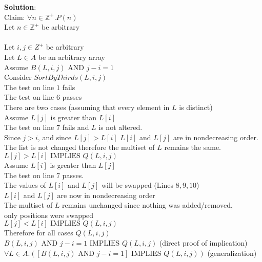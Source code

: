 \documentclass[11pt]{article}
\def\ints {{\mathbb Z}}
\newcommand{\Implies}{\mbox{ IMPLIES }}
\newcommand{\And}{\mbox{ AND }}
\begin{document}
\begin{enumerate}
\begin{solution}
{\bf Solution}:\\
Claim: $\forall n\in \ints^+.P(n)$\\
\null\quad Let $n\in \ints^+$ be arbitrary\\
\null{}\\
\null\qquad Let $i, j\in Z^+$ be arbitrary\\
\null\qquad\quad Let $L\in A$ be an arbitrary array\\
\null\qquad\qquad Assume $B(L, i, j) \And  j - i= 1$\\
\null\qquad\qquad Consider $SortByThirds(L, i, j)$\\
\null\qquad\qquad The test on line $1$ fails\\
\null\qquad\qquad The test on line $6$ passes\\
\null\qquad\qquad There are two cases (assuming that every element in $L$ is distinct)\\
\null\qquad\qquad\quad Assume $L[j]$ is greater than $L[i]$\\
\null\qquad\qquad\quad The test on line $7$ fails and $L$ is not altered.\\
\null\qquad\qquad\quad Since $j>i$, and since $L[j]>L[i]$ $L[i]$ and $L[j]$ are in nondecreasing order.\\
\null\qquad\qquad\quad The list is not changed therefore the multiset of $L$ remains the same.\\
\null\qquad\qquad $L[j]>L[i]\Implies Q(L, i, j)$\\
\null\qquad\qquad\quad Assume $L[i]$ is greater than $L[j]$\\
\null\qquad\qquad\quad The test on line $7$ passes.\\
\null\qquad\qquad\quad The values of $L[i]$ and $L[j]$ will be swapped (Lines $8,9,10$)\\
\null\qquad\qquad\quad $L[i]$ and $L[j]$ are now in nondecreasing order\\
\null\qquad\qquad\quad The multiset of $L$ remains unchanged since nothing was added/removed, \\
\null\qquad\qquad\quad only positions were swapped\\
\null\qquad\qquad $L[j] < L[i]\Implies Q(L, i, j)$\\
\null\qquad\qquad Therefore for all cases $Q(L, i, j)$\\
\null\qquad\quad $B(L, i, j) \And  j - i= 1\Implies Q(L, i, j)$ (direct proof of implication)\\
\null\qquad $\forall L\in A.\left([B(L, i, j) \And  j - i= 1]\Implies Q(L, i, j)\right)$ (generalization)\\

\end{solution}
\end{enumerate}
\end{document}
